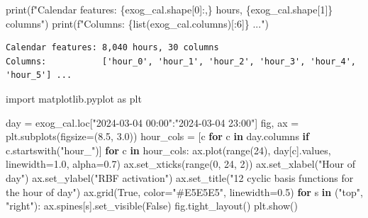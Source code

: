 \documentclass[
  english,
  letterpaper,
]{scrbook}
\newenvironment{Shaded}{\begin{snugshade}}{\end{snugshade}}
\newcommand{\BuiltInTok}[1]{\textcolor[rgb]{0.00,0.23,0.31}{#1}}
\newcommand{\ControlFlowTok}[1]{\textcolor[rgb]{0.00,0.23,0.31}{\textbf{#1}}}
\newcommand{\DecValTok}[1]{\textcolor[rgb]{0.68,0.00,0.00}{#1}}
\newcommand{\FloatTok}[1]{\textcolor[rgb]{0.68,0.00,0.00}{#1}}
\newcommand{\ImportTok}[1]{\textcolor[rgb]{0.00,0.46,0.62}{#1}}
\newcommand{\KeywordTok}[1]{\textcolor[rgb]{0.00,0.23,0.31}{\textbf{#1}}}
\newcommand{\NormalTok}[1]{\textcolor[rgb]{0.00,0.23,0.31}{#1}}
\newcommand{\OperatorTok}[1]{\textcolor[rgb]{0.37,0.37,0.37}{#1}}
\newcommand{\SpecialCharTok}[1]{\textcolor[rgb]{0.37,0.37,0.37}{#1}}
\newcommand{\SpecialStringTok}[1]{\textcolor[rgb]{0.13,0.47,0.30}{#1}}
\newcommand{\StringTok}[1]{\textcolor[rgb]{0.13,0.47,0.30}{#1}}
\newcommand{\VariableTok}[1]{\textcolor[rgb]{0.07,0.07,0.07}{#1}}
\begin{document}
\begin{Shaded}
\begin{Highlighting}[]
\BuiltInTok{print}\NormalTok{(}\SpecialStringTok{f"Calendar features: }\SpecialCharTok{\{}\NormalTok{exog\_cal}\SpecialCharTok{.}\NormalTok{shape[}\DecValTok{0}\NormalTok{]}\SpecialCharTok{:,\}}\SpecialStringTok{ hours, }\SpecialCharTok{\{}\NormalTok{exog\_cal}\SpecialCharTok{.}\NormalTok{shape[}\DecValTok{1}\NormalTok{]}\SpecialCharTok{\}}\SpecialStringTok{ columns"}\NormalTok{)}
\BuiltInTok{print}\NormalTok{(}\SpecialStringTok{f"Columns:           }\SpecialCharTok{\{}\BuiltInTok{list}\NormalTok{(exog\_cal.columns)[:}\DecValTok{6}\NormalTok{]}\SpecialCharTok{\}}\SpecialStringTok{ ..."}\NormalTok{)}
\end{Highlighting}
\end{Shaded}

\begin{verbatim}
Calendar features: 8,040 hours, 30 columns
Columns:           ['hour_0', 'hour_1', 'hour_2', 'hour_3', 'hour_4', 'hour_5'] ...
\end{verbatim}

\begin{Shaded}
\begin{Highlighting}[]
\ImportTok{import}\NormalTok{ matplotlib.pyplot }\ImportTok{as}\NormalTok{ plt}

\NormalTok{day }\OperatorTok{=}\NormalTok{ exog\_cal.loc[}\StringTok{"2024{-}03{-}04 00:00"}\NormalTok{:}\StringTok{"2024{-}03{-}04 23:00"}\NormalTok{]}
\NormalTok{fig, ax }\OperatorTok{=}\NormalTok{ plt.subplots(figsize}\OperatorTok{=}\NormalTok{(}\FloatTok{8.5}\NormalTok{, }\FloatTok{3.0}\NormalTok{))}
\NormalTok{hour\_cols }\OperatorTok{=}\NormalTok{ [c }\ControlFlowTok{for}\NormalTok{ c }\KeywordTok{in}\NormalTok{ day.columns }\ControlFlowTok{if}\NormalTok{ c.startswith(}\StringTok{"hour\_"}\NormalTok{)]}
\ControlFlowTok{for}\NormalTok{ c }\KeywordTok{in}\NormalTok{ hour\_cols:}
\NormalTok{    ax.plot(}\BuiltInTok{range}\NormalTok{(}\DecValTok{24}\NormalTok{), day[c].values, linewidth}\OperatorTok{=}\FloatTok{1.0}\NormalTok{, alpha}\OperatorTok{=}\FloatTok{0.7}\NormalTok{)}
\NormalTok{ax.set\_xticks(}\BuiltInTok{range}\NormalTok{(}\DecValTok{0}\NormalTok{, }\DecValTok{24}\NormalTok{, }\DecValTok{2}\NormalTok{))}
\NormalTok{ax.set\_xlabel(}\StringTok{"Hour of day"}\NormalTok{)}
\NormalTok{ax.set\_ylabel(}\StringTok{"RBF activation"}\NormalTok{)}
\NormalTok{ax.set\_title(}\StringTok{"12 cyclic basis functions for the hour of day"}\NormalTok{)}
\NormalTok{ax.grid(}\VariableTok{True}\NormalTok{, color}\OperatorTok{=}\StringTok{"\#E5E5E5"}\NormalTok{, linewidth}\OperatorTok{=}\FloatTok{0.5}\NormalTok{)}
\ControlFlowTok{for}\NormalTok{ s }\KeywordTok{in}\NormalTok{ (}\StringTok{"top"}\NormalTok{, }\StringTok{"right"}\NormalTok{):}
\NormalTok{    ax.spines[s].set\_visible(}\VariableTok{False}\NormalTok{)}
\NormalTok{fig.tight\_layout()}
\NormalTok{plt.show()}
\end{Highlighting}
\end{Shaded}
\end{document}
